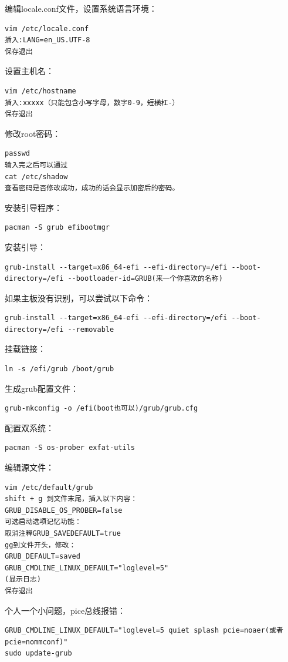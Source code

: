 \documentclass[a4paper, twocolumn, twoside, 10pt]{article}
\begin{document}
编辑locale.conf文件，设置系统语言环境：
\begin{lstlisting}
vim /etc/locale.conf
插入:LANG=en_US.UTF-8
保存退出
\end{lstlisting}

设置主机名：
\begin{lstlisting}
vim /etc/hostname
插入:xxxxx（只能包含小写字母，数字0-9，短横杠-）
保存退出
\end{lstlisting}

修改root密码：
\begin{lstlisting}
passwd
输入完之后可以通过
cat /etc/shadow
查看密码是否修改成功，成功的话会显示加密后的密码。
\end{lstlisting}

安装引导程序：
\begin{lstlisting}
pacman -S grub efibootmgr
\end{lstlisting}

安装引导：
\begin{lstlisting}
grub-install --target=x86_64-efi --efi-directory=/efi --boot-directory=/efi --bootloader-id=GRUB(来一个你喜欢的名称)
\end{lstlisting}

如果主板没有识别，可以尝试以下命令：
\begin{lstlisting}
grub-install --target=x86_64-efi --efi-directory=/efi --boot-directory=/efi --removable
\end{lstlisting}

挂载链接：
\begin{lstlisting}
ln -s /efi/grub /boot/grub
\end{lstlisting}

生成grub配置文件：
\begin{lstlisting}
grub-mkconfig -o /efi(boot也可以)/grub/grub.cfg
\end{lstlisting}

配置双系统：
\begin{lstlisting}
pacman -S os-prober exfat-utils
\end{lstlisting}

编辑源文件：
\begin{lstlisting}
vim /etc/default/grub
shift + g 到文件末尾，插入以下内容：
GRUB_DISABLE_OS_PROBER=false
可选启动选项记忆功能：
取消注释GRUB_SAVEDEFAULT=true
gg到文件开头，修改：
GRUB_DEFAULT=saved
GRUB_CMDLINE_LINUX_DEFAULT="loglevel=5"
(显示日志)
保存退出
\end{lstlisting}

个人一个小问题，pice总线报错：
\begin{lstlisting}
GRUB_CMDLINE_LINUX_DEFAULT="loglevel=5 quiet splash pcie=noaer(或者pcie=nommconf)"
sudo update-grub
\end{lstlisting}
\end{document}
